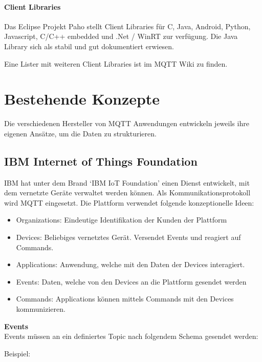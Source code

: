 \paragraph{Client Libraries}

Das Eclipse Projekt Paho \cite{paho} stellt Client Libraries für C, Java, Android, Python,
 Javascript, C/C++ embedded und .Net / WinRT zur verfügung. Die Java Library sich als stabil und gut dokumentiert erwiesen.

Eine Lister mit weiteren Client Libraries ist im MQTT Wiki \cite{clientLibs} zu finden.



\section{Bestehende Konzepte}
Die verschiedenen Hersteller von MQTT Anwendungen entwickeln jeweils ihre eigenen Ansätze, um die Daten zu strukturieren. 


\subsection{IBM Internet of Things Foundation}

IBM hat unter dem Brand `IBM IoT Foundation' \cite{ibmIotF:home} einen Dienst entwickelt, mit dem vernetzte Geräte verwaltet werden können. Als Kommunikationsprotokoll wird MQTT eingesetzt. Die Plattform verwendet folgende konzeptionelle Ideen:
\begin{itemize}
    \item Organizations: Eindeutige Identifikation der Kunden der Plattform
	\item Devices: Beliebiges vernetztes Gerät. Versendet Events und reagiert auf Commands.
	\item Applications: Anwendung, welche mit den Daten der Devices interagiert.
	\item Events: Daten, welche von den Devices an die Plattform gesendet werden
	\item Commands: Applications können mittels Commands mit den Devices kommunizieren.
\end{itemize}

\textbf{Events} \\
Events müssen an ein definiertes Topic nach folgendem Schema gesendet werden: \\

Beispiel: 

